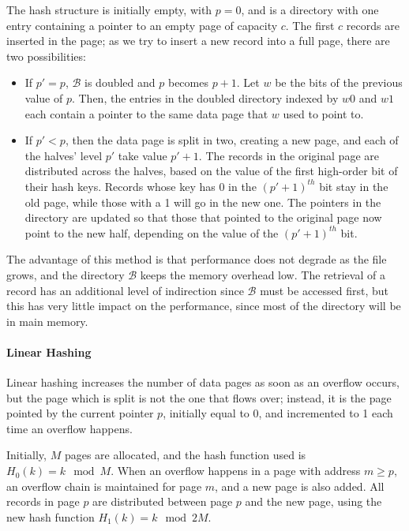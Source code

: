 The hash structure is initially empty, with $p=0$, and is a directory with one entry containing a pointer to an empty page of capacity $c$. The first $c$ records are inserted in the page; as we try to insert a new record into a full page, there are two possibilities:
\begin{itemize}
    \item If $p' = p$, $\mathcal{B}$ is doubled and $p$ becomes $p+1$. Let $w$ be the bits of the previous value of $p$. Then, the entries in the doubled directory indexed by $w0$ and $w1$ each contain a pointer to the same data page that $w$ used to point to.

    \item If $p' < p$, then the data page is split in two, creating a new page, and each of the halves' level $p'$ take value $p'+1$. The records in the original page are distributed across the halves, based on the value of the first high-order bit of their hash keys. Records whose key has 0 in the $(p'+1)^{th}$ bit stay in the old page, while those with a 1 will go in the new one. The pointers in the directory are updated so that those that pointed to the original page now point to the new half, depending on the value of the $(p'+1)^{th}$ bit.
\end{itemize}
The advantage of this method is that performance does not degrade as the file grows, and the directory $\mathcal{B}$ keeps the memory overhead low. The retrieval of a record has an additional level of indirection since $\mathcal{B}$ must be accessed first, but this has very little impact on the performance, since most of the directory will be in main memory.

\paragraph{Linear Hashing}

Linear hashing increases the number of data pages as soon as an overflow occurs, but the page which is split is not the one that flows over; instead, it is the page pointed by the current pointer $p$, initially equal to 0, and incremented to 1 each time an overflow happens.

Initially, $M$ pages are allocated, and the hash function used is $H_0(k) = k \mod M$. When an overflow happens in a page with address $m \geq p$, an overflow chain is maintained for page $m$, and a new page is also added. All records in page $p$ are distributed between page $p$ and the new page, using the new hash function $H_1(k) = k \mod 2M$.

